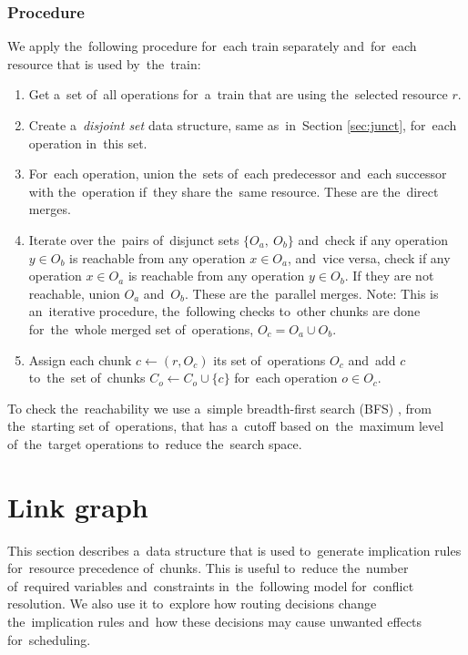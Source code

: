 \subsubsection{Procedure}
We apply the~following procedure for~each train separately and~for~each resource that is used by~the~train:
\begin{enumerate}
  \item Get a~set of~all operations for~a~train that are using the~selected resource $r$.
  \item Create a~\emph{disjoint set} data structure, same as~in~Section \ref{sec:junct}, for~each operation in~this set.
  \item For~each operation, union the~sets of~each predecessor and~each successor with the~operation if~they share the~same resource. These are the~direct merges.
  \item Iterate over the~pairs of~disjunct sets $\{O_{a},\ O_{b}\}$ and~check if any operation $y \in O_{b}$ is reachable from any operation $x \in O_{a}$, and~vice versa, check if any operation $x \in O_{a}$ is reachable from any operation $y \in O_{b}$. If they are not reachable, union $O_{a}$ and~$O_{b}$. These are the~parallel merges. Note: This is an~iterative procedure, the~following checks to~other chunks are done for~the~whole merged set of~operations, $O_c = O_{a} \cup O_{b}$.
  \item Assign each chunk $c \gets (r, O_c)$ its set of~operations $O_c$ and~add $c$ to~the~set of~chunks $C_o \gets C_o \cup \{c\}$ for~each operation $o \in O_c$.
\end{enumerate}

\begin{remark}
To check the~reachability we use a~simple breadth-first search (BFS) \cite{moore1959shortest}, from the~starting set of~operations, that has a~cutoff based on~the~maximum level of~the~target operations to~reduce the~search space.
\end{remark}


\section{Link graph}
\label{sec:link_graph}
This section describes a~data structure that is used to~generate implication rules for~resource precedence of~chunks. This is useful to~reduce the~number of~required variables and~constraints in~the~following model for~conflict resolution. We also use it to~explore how routing decisions change the~implication rules and~how these decisions may cause unwanted effects for~scheduling.

